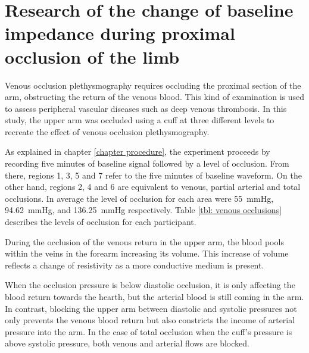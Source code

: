 
\chapter{Research of the change of baseline impedance during proximal occlusion of the limb}  %
\label{chapter occlusion}

\ifpdf
\graphicspath{{Chapter7/Figs/Raster/}{Chapter7/Figs/PDF/}{Chapter7/Figs/}}
\else
\graphicspath{{Chapter7/Figs/Vector/}{Chapter7/Figs/}}
\fi

Venous occlusion plethysmography requires occluding the proximal section of the arm, obstructing the return of the venous blood.  This kind of examination is used to assess peripheral vascular diseases such as deep venous thrombosis.  In this study, the upper arm was occluded using a cuff at three different levels to recreate the effect of venous occlusion plethysmography.

As explained in chapter \ref{chapter procedure}, the experiment proceeds by recording five minutes of baseline signal followed by a level of occlusion. From there, regions 1, 3, 5 and 7 refer to the five minutes of baseline waveform. On the other hand, regions 2, 4 and 6 are equivalent to venous, partial arterial and total occlusions. In average the level of occlusion for each area were \SI{55}{\mmHg}, \SI{94.62}{\mmHg}, and  \SI{136.25}{\mmHg} respectively. Table  \ref{tbl: venous occlusions} describes the levels of occlusion for each participant. 

During the occlusion of the venous return in the upper arm, the blood pools within the veins in the forearm increasing its volume. This increase of volume reflects a change of resistivity as a more conductive medium is present. 

When the occlusion pressure is below diastolic occlusion, it is only affecting the blood return towards the hearth, but the arterial blood is still coming in the arm. In contrast, blocking the upper arm between diastolic and systolic pressures not only prevents the venous blood return but also constricts the income of arterial pressure into the arm. In the case of total occlusion when the cuff's pressure is above systolic pressure, both venous and arterial flows are blocked. 

